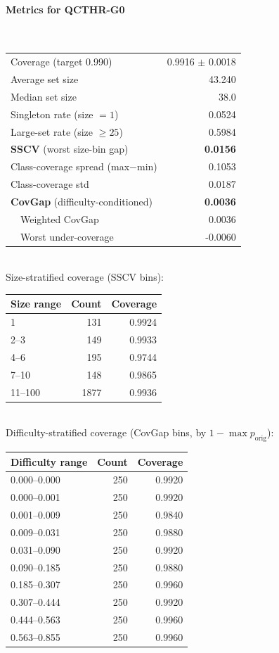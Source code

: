 \documentclass[parskip=half]{scrartcl}
\begin{document}
\paragraph{Metrics for QCTHR-G0}~\\
\begin{tabular}{l r}
\hline
Coverage (target 0.990) & 0.9916 $\pm$ 0.0018 \\
Average set size & 43.240 \\
Median set size & 38.0 \\
Singleton rate (size $=1$) & 0.0524 \\
Large-set rate (size $\geq 25$) & 0.5984 \\
\textbf{SSCV} (worst size-bin gap) & \textbf{0.0156} \\
Class-coverage spread (max$-$min) & 0.1053 \\
Class-coverage std & 0.0187 \\
\textbf{CovGap} (difficulty-conditioned) & \textbf{0.0036} \\
~~Weighted CovGap & 0.0036 \\
~~Worst under-coverage & -0.0060 \\
\hline
\end{tabular}\\[0.5em]
\textsf{\scriptsize Size-stratified coverage (SSCV bins):}\\
\begin{tabular}{l r r}
\hline
Size range & Count & Coverage \\
\hline
1 & 131 & 0.9924 \\
2--3 & 149 & 0.9933 \\
4--6 & 195 & 0.9744 \\
7--10 & 148 & 0.9865 \\
11--100 & 1877 & 0.9936 \\
\hline
\end{tabular}\\[0.5em]
\textsf{\scriptsize Difficulty-stratified coverage (CovGap bins, by $1-\max p_{\mathrm{orig}}$):}\\
\begin{tabular}{l r r}
\hline
Difficulty range & Count & Coverage \\
\hline
0.000--0.000 & 250 & 0.9920 \\
0.000--0.001 & 250 & 0.9920 \\
0.001--0.009 & 250 & 0.9840 \\
0.009--0.031 & 250 & 0.9880 \\
0.031--0.090 & 250 & 0.9920 \\
0.090--0.185 & 250 & 0.9880 \\
0.185--0.307 & 250 & 0.9960 \\
0.307--0.444 & 250 & 0.9920 \\
0.444--0.563 & 250 & 0.9960 \\
0.563--0.855 & 250 & 0.9960 \\
\hline
\end{tabular}\\[0.5em]
\end{document}

